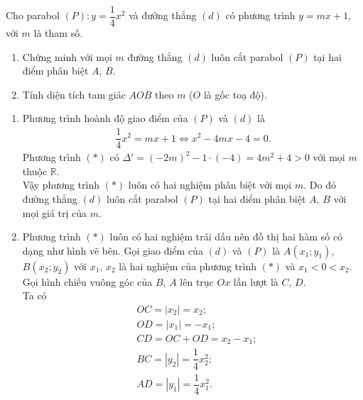 \begin{ex}%
 Cho parabol $(P) : y =\dfrac{1}{4}x^2$ và đường thẳng $(d)$ có phương trình $y =mx+1$, với $m$ là tham số.
 \begin{enumerate}
  \item Chứng minh với mọi $m$ đường thẳng $(d)$ luôn cắt parabol $(P)$ tại hai điểm phân biệt $A$, $B$. 
  \item Tính diện tích tam giác $AOB$ theo $m$ ($O$ là gốc toạ độ).
\end{enumerate}
 \loigiai
  {
  \begin{enumerate}
   \item Phương trình hoành độ giao điểm của $(P)$ và $(d)$ là
   \begin{align*}
    \dfrac{1}{4}x^2 = mx+1 \Leftrightarrow x^2 - 4mx - 4 = 0. \tag{*}
   \end{align*}
   Phương trình $(*)$ có $\Delta' = (-2m)^2 - 1 \cdot (-4) = 4m^2 + 4 > 0$ với mọi $m$ thuộc $\mathbb{R}$.\\
   Vậy phương trình $(*)$ luôn có hai nghiệm phân biệt với mọi $m$. Do đó đường thẳng $(d)$ luôn cắt parabol $(P)$ tại hai điểm phân biệt $A$, $B$ với mọi giá trị của $m$.
   \item Phương trình $(*)$ luôn có hai nghiệm trái dấu nên đồ thị hai hàm số có dạng như hình vẽ bên.
   \immini
   {
   Gọi giao điểm của $(d)$ và $(P)$ là $A(x_1;y_1)$, $B(x_2;y_2)$ với $x_1$, $x_2$ là hai nghiệm của phương trình $(*)$ và $x_1 < 0 < x_2$.\\
   Gọi hình chiếu vuông góc của $B$, $A$ lên trục $Ox$ lần lượt là $C$, $D$.\\
   Ta có
   \begin{align*}
    & OC = |x_2| = x_2;\\
    & OD = |x_1| = -x_1;\\
    & CD = OC + OD = x_2 - x_1;\\
    & BC = |y_2| = \dfrac{1}{4}x_2^2;\\
    & AD = |y_1| = \dfrac{1}{4}x_1^2.
   \end{align*}
   }
   {
   }
\end{enumerate}}
\end{ex}
